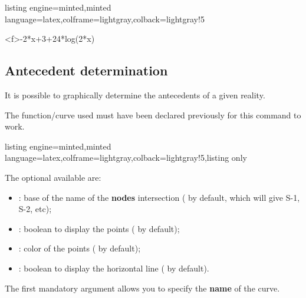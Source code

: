 \documentclass[11pt,a4paper]{ltxdoc}
\begin{document}
\begin{tcblisting}{listing engine=minted,minted language=latex,colframe=lightgray,colback=lightgray!5}
\begin{GraphTikz}%
	[x=0.9cm,y=0.425cm,Xmin=4,Xmax=20,Origx=4,
	Ymin=40,Ymax=56,Ygrid=2,Ygrids=1,Origy=40]
	{-2*x+3+24*log(2*x)}
\end{GraphTikz}
\end{tcblisting}

\pagebreak

\subsection{Antecedent determination}\label{defanteced}

It is possible to graphically determine the antecedents of a given reality.

The function/curve used must have been declared previously for this command to work.

\begin{tcblisting}{listing engine=minted,minted language=latex,colframe=lightgray,colback=lightgray!5,listing only}
\end{tcblisting}

The optional \MontreCode{[keys]} available are:

\smallskip

\begin{itemize}
	\item {}: base of the name of the \textbf{nodes} intersection ( by default, which will give \textsf{S-1}, \textsf{S-2}, etc);
	\item {}: boolean to display the points ( by default);
	\item {}: color of the points ( by default);
	\item {}: boolean to display the horizontal line ( by default).
\end{itemize}

\smallskip

The first mandatory argument allows you to specify the \textbf{name} of the curve.
\end{document}
